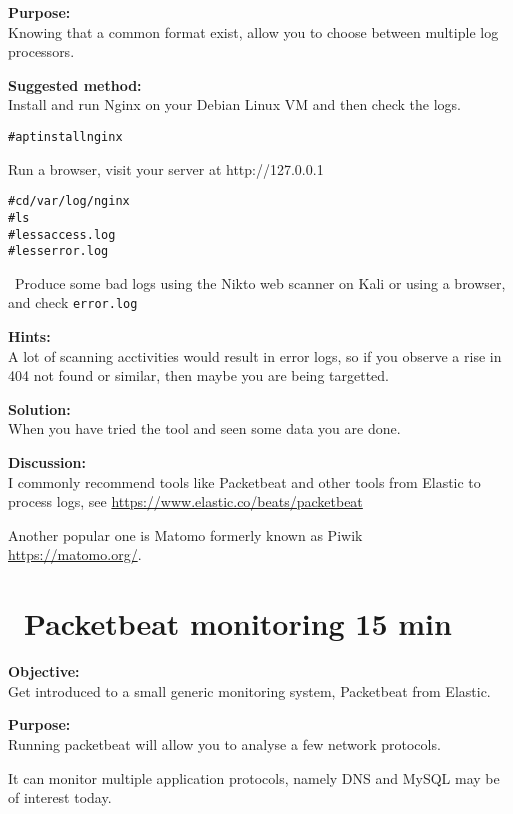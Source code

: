 \documentclass[a4paper,11pt,notitlepage]{report}
\begin{document}
{\bf Purpose:}\\
Knowing that a common format exist, allow you to choose between multiple log processors.


{\bf Suggested method:}\\
Install and run Nginx on your Debian Linux VM and then check the logs.

\begin{alltt}
# apt install nginx
\end{alltt}

Run a browser, visit your server at http://127.0.0.1

\begin{alltt}
# cd /var/log/nginx
# ls
# less access.log
# less error.log
\end{alltt}

\faInfoCircle\
Produce some bad logs using the Nikto web scanner on Kali or using a browser, and check \verb+error.log+


{\bf Hints:}\\
A lot of scanning acctivities would result in error logs, so if you observe a rise in 404 not found or similar, then maybe you are being targetted.

{\bf Solution:}\\
When you have tried the tool and seen some data you are done.

{\bf Discussion:}\\
I commonly recommend tools like Packetbeat and other tools from Elastic to process logs, see \url{https://www.elastic.co/beats/packetbeat}

Another popular one is Matomo formerly known as Piwik\\
\url{https://matomo.org/}.


\chapter{\faInfoCircle\  Packetbeat monitoring 15 min}
\label{ex:packetbeat}


{\bf Objective:}\\
Get introduced to a small generic monitoring system, Packetbeat from Elastic.


{\bf Purpose:}\\
Running packetbeat will allow you to analyse a few network protocols.

It can monitor multiple application protocols, namely DNS and MySQL may be of interest today.
\end{document}

